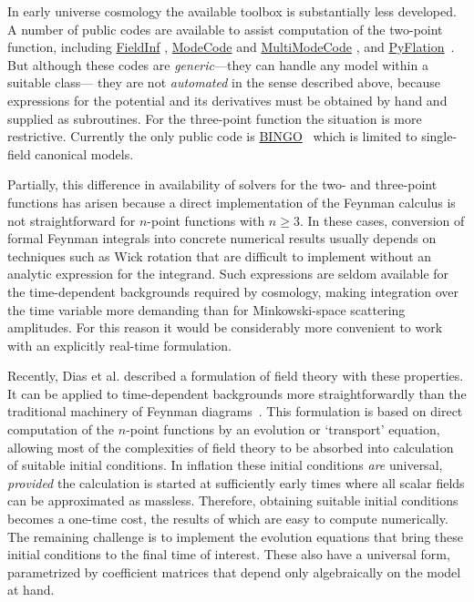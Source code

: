\documentclass[11pt,a4paper]{article}
\newcommand{\packagefont}{\sffamily}
\newcommand{\ModeCode}{{\packagefont ModeCode}}
\newcommand{\MultiModeCode}{{\packagefont MultiModeCode}}
\newcommand{\FieldInf}{{\packagefont FieldInf}}
\newcommand{\PyFlation}{{\packagefont PyFlation}}
\newcommand{\BINGO}{{\packagefont BINGO}}
\renewcommand{\geq}{\geqslant}
\begin{document}
In early universe cosmology the available toolbox is substantially less developed.
A number of public codes are available to assist computation of the
two-point function,
including
\href{http://theory.physics.unige.ch/~ringeval/fieldinf.html}{\FieldInf}
\cite{Ringeval:2005yn,Martin:2006rs,Ringeval:2007am},
\href{http://modecode.org}{\ModeCode} and
\href{http://modecode.org}{\MultiModeCode}
\cite{Mortonson:2010er,Easther:2011yq,Norena:2012rs,Price:2014xpa},
and
\href{http://pyflation.ianhuston.net}{\PyFlation}~\cite{Huston:2009ac,
Huston:2011vt,Huston:2011fr}.
But although these codes are \emph{generic}---they can handle any model
within a suitable class---%
they are not \emph{automated} in the sense described above,
because expressions for the potential and its derivatives must be obtained
by hand and supplied as subroutines.
For the three-point function the situation is more restrictive.
Currently the only public code is
\href{https://sites.google.com/site/codecosmo/bingo}{\BINGO}~\cite{Hazra:2012yn,
Sreenath:2014nca}
which is limited to single-field canonical models.

Partially, this difference
in availability of solvers for the two- and three-point functions
has arisen because
a direct implementation of the Feynman calculus is not straightforward
for $n$-point functions with $n \geq 3$.
In these cases, conversion of formal Feynman integrals into concrete
numerical results
usually
depends on techniques such as Wick rotation
that are difficult to implement without an analytic
expression for the integrand.
Such expressions are seldom available
for the time-dependent backgrounds required by cosmology,
making
integration over the time variable more
demanding than for Minkowski-space scattering amplitudes.
For this reason it would be considerably more convenient to work with an
explicitly real-time formulation.

Recently, Dias et al. described a
formulation of field theory with these properties.
It can be applied to time-dependent backgrounds more straightforwardly
than the traditional machinery of Feynman diagrams~\cite{DiasFrazerMulryneSeery}.
This formulation is based on direct computation of the $n$-point functions
by an evolution or `transport' equation,
allowing most of the complexities of field theory to be absorbed into
calculation of suitable initial conditions.
In inflation these initial conditions \emph{are} universal,
\emph{provided} the calculation is started at sufficiently early times where
all scalar fields can be approximated as massless.
Therefore, obtaining suitable initial conditions becomes a one-time
cost, the results of which are easy to compute numerically.
The remaining challenge is to implement the evolution equations that
bring these initial conditions
to the final time of interest.
These also have a universal form,
parametrized by coefficient matrices
that depend only algebraically on the model at hand.
\end{document}
